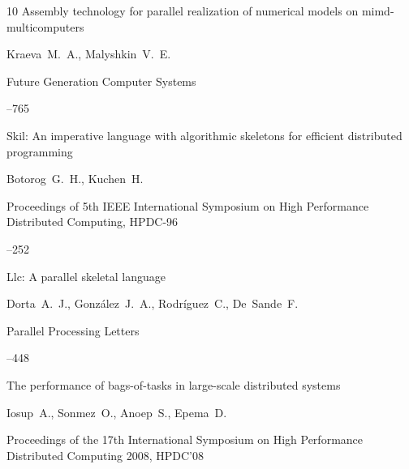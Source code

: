 \begin{thebibliography}{10}
\paper Assembly technology for parallel realization of   numerical models on mimd-multicomputers

\by Kraeva~M.~A., Malyshkin~V.~E.

\jour Future Generation Computer Systems




--765









\paper Skil: An imperative language with algorithmic   skeletons for efficient distributed programming

\by Botorog~G.~H., Kuchen~H.

\inbook Proceedings of 5th IEEE International Symposium on High Performance Distributed Computing, \rm HPDC-96


--252






\paper Llc: A parallel skeletal lan\-guage

\by Dorta~A.~J., Gonz\'alez~J.~A., Rodr\'iguez~C., De~Sande~F.

\jour Parallel Processing   Letters




--448





\paper The performance of bags-of-tasks in large-scale distributed systems

\by   Iosup~A., Sonmez~O., Anoep~S., Epema~D.

\inbook Proceedings of the 17th International Symposium on High Performance Distributed Computing 2008, \rm HPDC'08


\end{thebibliography}
